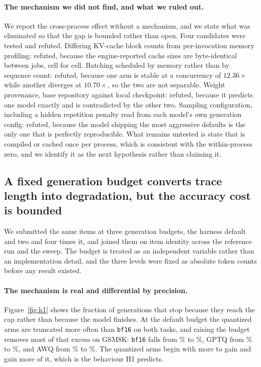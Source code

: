 \documentclass[conference]{IEEEtran}
\begin{document}
\paragraph{The mechanism we did not find, and what we ruled out.}
We report the cross-process effect without a mechanism, and we state what was
eliminated so that the gap is bounded rather than open. Four candidates were
tested and refuted. Differing KV-cache block counts from per-invocation memory
profiling: refuted, because the engine-reported cache sizes are byte-identical
between jobs, cell for cell. Batching scheduled by memory rather than by
sequence count: refuted, because one arm is stable at a concurrency of
$12.36\times$ while another diverges at $10.70\times$, so the two are not
separable. Weight provenance, base repository against local checkpoint: refuted,
because it predicts one model exactly and is contradicted by the other two.
Sampling configuration, including a hidden repetition penalty read from each
model's own generation config: refuted, because the model shipping the most
aggressive defaults is the only one that is perfectly reproducible. What remains
untested is state that is compiled or cached once per process, which is
consistent with the within-process zero, and we identify it as the next
hypothesis rather than claiming it.

\subsection{A fixed generation budget converts trace length into degradation, but the
accuracy cost is bounded}
\label{sec:h1}


We submitted the same \hOneItems{} items at three generation budgets, the harness default
and two and four times it, and joined them on item identity across the reference run and
the sweep. The budget is treated as an independent variable rather than an implementation
detail, and the three levels were fixed as absolute token counts before any result existed.

\paragraph{The mechanism is real and differential by precision.}
Figure~\ref{fig:h1} shows the fraction of generations that stop because they reach the cap
rather than because the model finishes. At the default budget the quantized arms are
truncated more often than \texttt{bf16} on both tasks, and raising the budget removes most
of that excess on GSM8K: \texttt{bf16} falls from \hOneCapBfOne\% to \hOneCapBfFour\%, GPTQ
from \hOneCapGptqOne\% to \hOneCapGptqFour\%, and AWQ from \hOneCapAwqOne\% to
\hOneCapAwqFour\%. The quantized arms begin with more to gain and gain more of it, which is
the behaviour H1 predicts.
\end{document}
